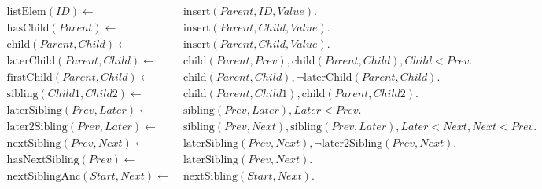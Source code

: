 \documentclass[twocolumn,10pt]{article}
\begin{document}




\begin{figure*}
\begin{align*}
    \mathrm{listElem}(\mathit{ID}) \leftarrow\; &
    \mathrm{insert}(\mathit{Parent}, \mathit{ID}, \mathit{Value}).
\\
    \mathrm{hasChild}(\mathit{Parent}) \leftarrow\; &
    \mathrm{insert}(\mathit{Parent}, \mathit{Child}, \mathit{Value}).
\\
    \mathrm{child}(\mathit{Parent}, \mathit{Child}) \leftarrow\; &
    \mathrm{insert}(\mathit{Parent}, \mathit{Child}, \mathit{Value}).
\\
    \mathrm{laterChild}(\mathit{Parent}, \mathit{Child}) \leftarrow\; &
    \mathrm{child}(\mathit{Parent}, \mathit{Prev}),
    \mathrm{child}(\mathit{Parent}, \mathit{Child}),
    \mathit{Child} < \mathit{Prev}.
\\
    \mathrm{firstChild}(\mathit{Parent}, \mathit{Child}) \leftarrow\; &
    \mathrm{child}(\mathit{Parent}, \mathit{Child}),
    \neg\mathrm{laterChild}(\mathit{Parent}, \mathit{Child}).
\\
    \mathrm{sibling}(\mathit{Child1}, \mathit{Child2}) \leftarrow\; &
    \mathrm{child}(\mathit{Parent}, \mathit{Child1}),
    \mathrm{child}(\mathit{Parent}, \mathit{Child2}).
\\
    \mathrm{laterSibling}(\mathit{Prev}, \mathit{Later}) \leftarrow\; &
    \mathrm{sibling}(\mathit{Prev}, \mathit{Later}),
    \mathit{Later} < \mathit{Prev}.
\\
    \mathrm{later2Sibling}(\mathit{Prev}, \mathit{Later}) \leftarrow\; &
    \mathrm{sibling}(\mathit{Prev}, \mathit{Next}),
    \mathrm{sibling}(\mathit{Prev}, \mathit{Later}),
    \mathit{Later} < \mathit{Next},
    \mathit{Next} < \mathit{Prev}.
\\
    \mathrm{nextSibling}(\mathit{Prev}, \mathit{Next}) \leftarrow\; &
    \mathrm{laterSibling}(\mathit{Prev}, \mathit{Next}),
    \neg\mathrm{later2Sibling}(\mathit{Prev}, \mathit{Next}).
\\
    \mathrm{hasNextSibling}(\mathit{Prev}) \leftarrow\; &
    \mathrm{laterSibling}(\mathit{Prev}, \mathit{Next}).
\\
    \mathrm{nextSiblingAnc}(\mathit{Start}, \mathit{Next}) \leftarrow\; &
    \mathrm{nextSibling}(\mathit{Start}, \mathit{Next}).

\end{align*}
\end{figure*}
\end{document}
